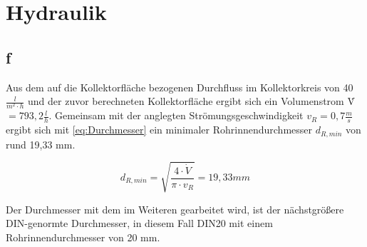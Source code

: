 \newpage
\section{Hydraulik}
\label{sec:Hydraulik}
\subsection{f}
Aus dem auf die Kollektorfläche bezogenen Durchfluss im Kollektorkreis von 40 $\frac{l}{m^2\cdot h}$
und der zuvor berechneten Kollektorfläche ergibt sich ein Volumenstrom \.V $=793,2 \frac{l}{h}$.
Gemeinsam mit der anglegten Strömungsgeschwindigkeit $v_R = 0,7 \frac{m}{s}$ ergibt sich mit \autoref{eq:Durchmesser} \cite[S.42]{Sick22}
ein minimaler Rohrinnendurchmesser $d_{R,min}$ von rund 19,33 mm.

\begin{equation}
    d_{R,min}=\sqrt{\frac{4 \cdot \dot{V}}{\pi \cdot v_R}}=19,33 mm
    \label{eq:Durchmesser}
\end{equation}

Der Durchmesser mit dem im Weiteren gearbeitet wird, ist der nächstgrößere DIN-genormte Durchmesser,
in diesem Fall DIN20 mit einem Rohrinnendurchmesser von 20 mm.\\